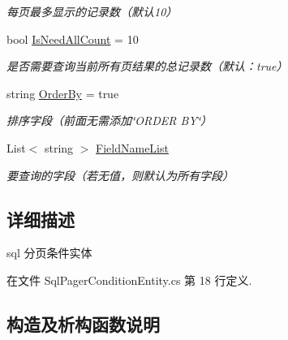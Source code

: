 \begin{DoxyCompactItemize}
\begin{DoxyCompactList}\small\item\em 每页最多显示的记录数（默认10） \end{DoxyCompactList}\item 
bool \hyperlink{class_x_c_l_net_tools_1_1_entity_1_1_sql_pager_condition_entity_ae14dfee7db160c5c894201e014cc1ce0}{Is\+Need\+All\+Count} = 10
\begin{DoxyCompactList}\small\item\em 是否需要查询当前所有页结果的总记录数（默认：true） \end{DoxyCompactList}\item 
string \hyperlink{class_x_c_l_net_tools_1_1_entity_1_1_sql_pager_condition_entity_a311a6c9cbb127ec03d11e8211dc42e37}{Order\+By} = true
\begin{DoxyCompactList}\small\item\em 排序字段（前面无需添加\char`\"{}\+O\+R\+D\+E\+R B\+Y\char`\"{}） \end{DoxyCompactList}\item 
List$<$ string $>$ \hyperlink{class_x_c_l_net_tools_1_1_entity_1_1_sql_pager_condition_entity_a18c7b5f8ccc1dd9b47c897ad3ff29899}{Field\+Name\+List}
\begin{DoxyCompactList}\small\item\em 要查询的字段（若无值，则默认为所有字段） \end{DoxyCompactList}\end{DoxyCompactItemize}


\subsection{详细描述}
sql 分页条件实体 



在文件 Sql\+Pager\+Condition\+Entity.\+cs 第 18 行定义.



\subsection{构造及析构函数说明}
\mbox{\label{class_x_c_l_net_tools_1_1_entity_1_1_sql_pager_condition_entity_a8b6d71348a2cbfd9f609215a9d1af699}} 
